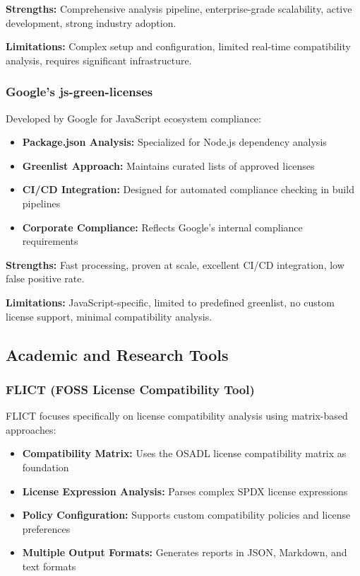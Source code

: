 \documentclass[9pt,twocolumn]{article}
\begin{document}
\textbf{Strengths:} Comprehensive analysis pipeline, enterprise-grade scalability, active development, strong industry adoption.

\textbf{Limitations:} Complex setup and configuration, limited real-time compatibility analysis, requires significant infrastructure.

\subsubsection{Google's js-green-licenses}
Developed by Google for JavaScript ecosystem compliance:

\begin{itemize}
    \item \textbf{Package.json Analysis:} Specialized for Node.js dependency analysis
    \item \textbf{Greenlist Approach:} Maintains curated lists of approved licenses
    \item \textbf{CI/CD Integration:} Designed for automated compliance checking in build pipelines
    \item \textbf{Corporate Compliance:} Reflects Google's internal compliance requirements
\end{itemize}

\textbf{Strengths:} Fast processing, proven at scale, excellent CI/CD integration, low false positive rate.

\textbf{Limitations:} JavaScript-specific, limited to predefined greenlist, no custom license support, minimal compatibility analysis.

\subsection{Academic and Research Tools}

\subsubsection{FLICT (FOSS License Compatibility Tool)}
FLICT focuses specifically on license compatibility analysis using matrix-based approaches:

\begin{itemize}
    \item \textbf{Compatibility Matrix:} Uses the OSADL license compatibility matrix as foundation
    \item \textbf{License Expression Analysis:} Parses complex SPDX license expressions
    \item \textbf{Policy Configuration:} Supports custom compatibility policies and license preferences
    \item \textbf{Multiple Output Formats:} Generates reports in JSON, Markdown, and text formats
\end{itemize}
\end{document}
